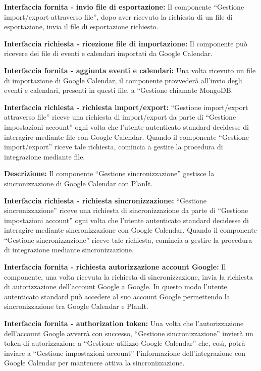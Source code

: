 \begin{listaPersonale}[]{}
    \textbf{Interfaccia fornita - invio file di esportazione:} Il componente “Gestione import/export attraverso file”, dopo aver ricevuto la richiesta di un file di esportazione, invia il file di esportazione richiesto.

    \textbf{Interfaccia richiesta - ricezione file di importazione:} Il componente può ricevere dei file di eventi e calendari importati da Google Calendar.

    \textbf{Interfaccia fornita - aggiunta eventi e calendari:} Una volta ricevuto un file di importazione di Google Calendar, il componente provvederà all'invio degli eventi e calendari, presenti in questi file, a “Gestione chiamate MongoDB.

    \textbf{Interfaccia richiesta - richiesta import/export:} “Gestione import/export attraverso file” riceve una richiesta di import/export da parte di “Gestione impostazioni account” ogni volta che l'utente autenticato standard decidesse di interagire mediante file con Google Calendar. Quando il componente “Gestione import/export” riceve tale richiesta, comincia a gestire la procedura di integrazione mediante file.



    \textbf{Descrizione:}   Il componente “Gestione sincronizzazione” gestisce la sincronizzazione di Google Calendar con PlanIt.

    \textbf{Interfaccia richiesta - richiesta sincronizzazione:} “Gestione sincronizzazione” riceve una richiesta di sincronizzazione da parte di “Gestione impostazioni account” ogni volta che l'utente autenticato standard decidesse di interagire mediante sincronizzazione con Google Calendar. Quando il componente “Gestione sincronizzazione” riceve tale richiesta, comincia a gestire la procedura di integrazione mediante sincronizzazione.

    \textbf{Interfaccia fornita - richiesta autorizzazione account Google:} Il componente, una volta ricevuta la richiesta di sincronizzazione, invia la richiesta di autorizzazione dell'account Google a Google. In questo modo l'utente autenticato standard può accedere al suo account Google permettendo la sincronizzazione tra Google Calendar e PlanIt.

    \textbf{Interfaccia fornita - authorization token:} Una volta che l'autorizzazione dell'account Google avverrà con successo, “Gestione sincronizzazione” invierà un token di autorizzazione a “Gestione utilizzo Google Calendar” che, così, potrà inviare a “Gestione impostazioni account” l'informazione dell'integrazione con Google Calendar per mantenere attiva la sincronizzazione.



\end{listaPersonale}
